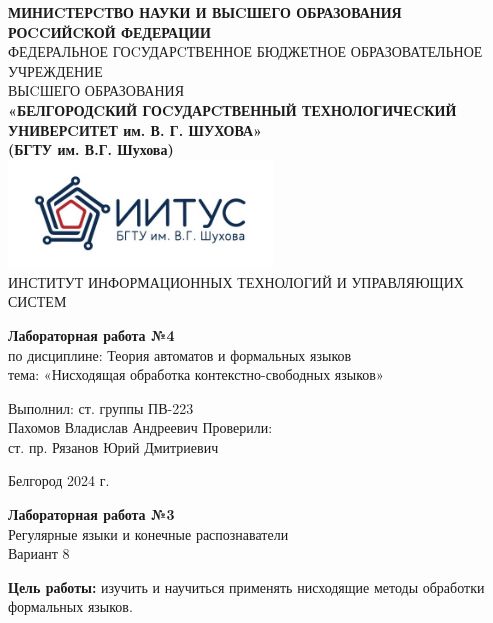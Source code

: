 \documentclass[a4paper,14pt]{extarticle}
\newcommand\textbox[1]{
	\parbox{.45\textwidth}{#1}
}
\begin{document}
\begin{center}
    \small{
        \textbf{МИНИCТЕРCТВО НАУКИ И ВЫCШЕГО ОБРАЗОВАНИЯ РОCCИЙCКОЙ ФЕДЕРАЦИИ}\\
        ФЕДЕРАЛЬНОЕ ГОCУДАРCТВЕННОЕ БЮДЖЕТНОЕ ОБРАЗОВАТЕЛЬНОЕ УЧРЕЖДЕНИЕ\\ВЫCШЕГО ОБРАЗОВАНИЯ \\
        \textbf{«БЕЛГОРОДCКИЙ ГОCУДАРCТВЕННЫЙ ТЕХНОЛОГИЧЕCКИЙ\\УНИВЕРCИТЕТ им. В. Г. ШУХОВА»\\ (БГТУ им. В.Г. Шухова)} \\
        \bigbreak
        \includegraphics[width=70mm]{log}\\
        ИНСТИТУТ ИНФОРМАЦИОННЫХ ТЕХНОЛОГИЙ И УПРАВЛЯЮЩИХ СИСТЕМ\\}
\end{center}

\vfill
\begin{center}
    \large{
        \textbf{
            Лабораторная работа №4}}\\
    \normalsize{
        по дисциплине: Теория автоматов и формальных языков \\
        тема: «Нисходящая обработка контекстно-свободных языков»}
\end{center}
\vfill
\hfill\textbox{
    Выполнил: ст. группы ПВ-223\\Пахомов Владислав Андреевич
    \bigbreak
    Проверили: \\ст. пр. Рязанов Юрий Дмитриевич
}
\vfill\begin{center}
    Белгород 2024 г.
\end{center}
\newpage
\begin{center}
    \textbf{Лабораторная работа №3}\\
    Регулярные языки и конечные распознаватели\\
    Вариант 8
\end{center}
\textbf{Цель работы: }изучить и научиться применять нисходящие методы обработки формальных языков.\\
\end{document}
